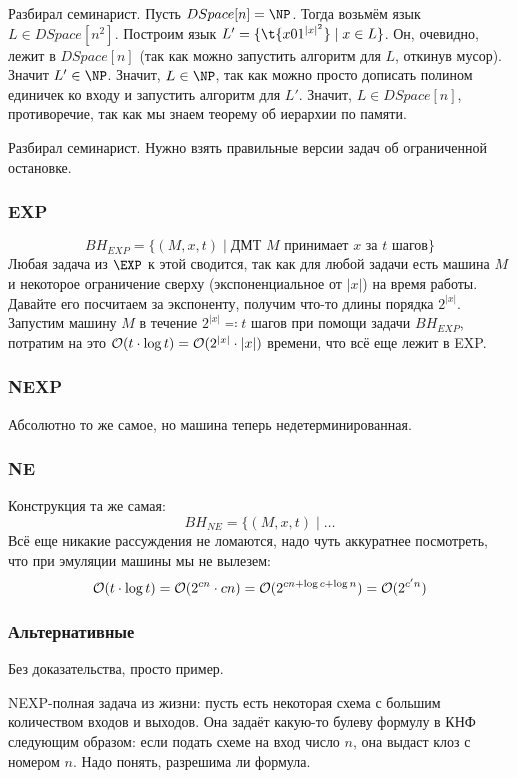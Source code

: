 	Разбирал семинарист.
	Пусть $DSpace[n] = \NP$.
	Тогда возьмём язык $L \in DSpace[n^2]$.
	Построим язык $L' = \{ \t{x01^{|x|^2}} \mid x \in L \}$.
	Он, очевидно, лежит в $DSpace[n]$ (так как можно запустить алгоритм для $L$, откинув мусор).
	Значит $L' \in \NP$.
	Значит, $L \in \NP$, так как можно просто дописать полином единичек ко входу и запустить алгоритм для $L'$.
	Значит, $L \in DSpace[n]$, противоречие, так как мы знаем теорему об иерархии по памяти.

	Разбирал семинарист.
	Нужно взять правильные версии задач об ограниченной остановке.

	\subsubsection{EXP}
		\[ BH_{EXP} = \{ (M, x, t) \mid \text{ДМТ $M$ принимает $x$ за $t$ шагов} \} \]
		Любая задача из $\EXP$ к этой сводится, так как для любой задачи есть машина $M$
		и некоторое ограничение сверху (экспоненциальное от $|x|$) на время работы.
		Давайте его посчитаем за экспоненту, получим что-то длины порядка $2^{|x|}$.
		Запустим машину $M$ в течение $2^{|x|} \eqcolon t$ шагов при помощи задачи $BH_{EXP}$,
		потратим на это $\mathcal O(t \cdot \log t)=\mathcal O(2^{|x|} \cdot |x|)$ времени, что всё еще лежит в EXP.

	\subsubsection{NEXP}
		Абсолютно то же самое, но машина теперь недетерминированная.

	\subsubsection{NE}
		Конструкция та же самая:
		\[ BH_{NE} = \{ (M, x, t) \mid \dots \]
		Всё еще никакие рассуждения не ломаются, надо чуть аккуратнее посмотреть, что при эмуляции
		машины мы не вылезем:
		\[ \mathcal O(t \cdot \log t) = \mathcal O(2^{cn} \cdot cn) = \mathcal O(2^{cn+\log c + \log n}) = \mathcal O(2^{c'n})\]

	\subsubsection{Альтернативные}
		Без доказательства, просто пример.

		NEXP-полная задача из жизни: пусть есть некоторая схема с большим количеством входов и выходов.
		Она задаёт какую-то булеву формулу в КНФ следующим образом: если подать схеме на вход число $n$,
		она выдаст клоз с номером $n$.
		Надо понять, разрешима ли формула.

